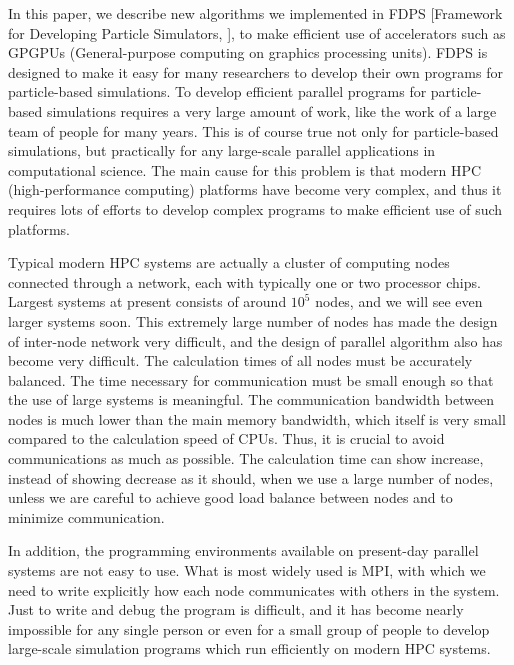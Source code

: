 \documentclass[dvipdfmx]{pasj01}
\begin{document}
In this paper, we describe new algorithms we implemented in FDPS
[Framework for Developing Particle Simulators, \citep{Iwasawaetal2016,
    2018PASJ..tmp...76N}], to make efficient use of accelerators such
as GPGPUs (General-purpose computing on graphics processing
units). FDPS is designed to make it easy for many researchers to
develop their own programs for particle-based simulations. To develop
efficient parallel programs for particle-based simulations requires a
very large amount of work, like the work of a large team of people for
many years. This is of course true not only for particle-based
simulations, but practically for any large-scale parallel applications
in computational science. The main cause for this problem is that
modern HPC (high-performance computing) platforms have become very
complex, and thus it requires lots of efforts to develop complex
programs to make efficient use of such platforms.

Typical modern HPC systems are actually a cluster of computing nodes
connected through a network, each with typically one or two processor
chips. Largest systems at present consists of around $10^5$ nodes, and
we will see even larger systems soon. This extremely large number of
nodes has made the design of inter-node network very difficult, and
the design of parallel algorithm also has become very difficult. The
calculation times of all nodes must be accurately balanced. The time
necessary for communication must be small enough so that the use of
large systems is meaningful. The communication bandwidth between nodes
is much lower than the main memory bandwidth, which itself is very
small compared to the calculation speed of CPUs. Thus, it is crucial
to avoid communications as much as possible. The calculation time can
show increase, instead of showing decrease as it should, when we use a
large number of nodes, unless we are careful to achieve good load
balance between nodes and to minimize communication.

In addition, the programming environments available on present-day
parallel systems are not easy to use. What is most widely used is MPI,
with which we need to write explicitly how each node communicates with
others in the system. Just to write and debug the program is
difficult, and it has become nearly impossible for any single person
or even for a small group of people to develop large-scale simulation
programs which run efficiently on modern HPC systems.
\end{document}
